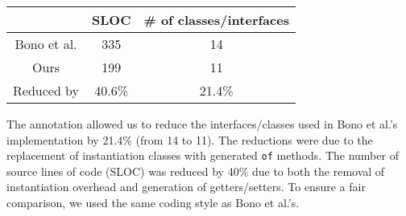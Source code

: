 \vspace{5pt}
\begin{tabular}{ccc}
\hline
            & SLOC   & \# of classes/interfaces \\ \hline
Bono et al. & 335    & 14                       \\
Ours        & 199    & 11                       \\
\rowcolor[HTML]{C0C0C0}
Reduced by  & 40.6\% & 21.4\%                   \\ \hline
\end{tabular}
\vspace{5pt}

\noindent The \mixin annotation allowed us to reduce the interfaces/classes used
in Bono et al.'s implementation by 21.4\% (from 14 to 11). The
reductions were due to the replacement of instantiation classes with
generated \texttt{of} methods. The number of source lines of code (SLOC)
was reduced by 40\% due to both the removal of instantiation overhead and
generation of getters/setters. %
To ensure a fair comparison, we used the same coding style as Bono et al.'s.

\begin{comment}
\subsection{Refactoring a Compiler}
The last case study applies our approach to a slightly larger code base of a simple
one-pass compiler for \lstinline{C0} (a subset of \lstinline{C}). This compiler
is a handwritten, monolithic compiler used for educational purposes at Aarhus
University, Denmark\footnote{Source code available at
  http://cs.au.dk/~mis/dOvs/Czero.java}. \lstinline{C0} is restricted to
integers, several control structures and function declaration/definition and
basic I/O statements. All the code (including parsing, code generation for
various structures, error handling) is entangled in one big file. Following our
approach with \mixin, we refactored the code to several smaller interfaces
(including \lstinline{Constants}, \lstinline{MemberFields}, interfaces for
parsing different structures, etc). After the refactoring, the new code does not
reduce code as previous case studies. SLOC for original code without comments
and blank lines is 828, while ours is 830 (for fair comparison, we put all
interfaces into one file when calculating SLOC). However, the case study shows
two things: Classless Java can be applied to real code base such as compilers;
code becomes more modular without the sacrifice of code amount/simplicity.
\marco{Why we do not cite the result of the former study? the one with object algebraes
where the number of lines grown quite a while?}
\end{comment}

